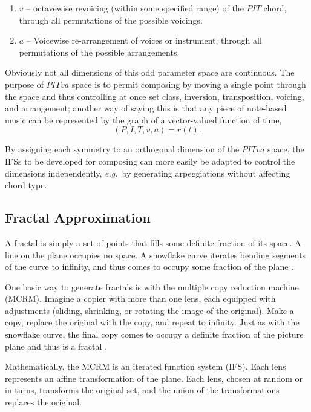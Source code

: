 \documentclass[english,11pt,letterpaper,onecolumn]{scrartcl}
\numberwithin{equation}{section}
\begin{document}
    \begin{enumerate}[resume]
        \item $v$ -- octavewise revoicing (within some specified range) of the 
        $PIT$ chord, through all permutations of the possible voicings.
        \item $a$ -- Voicewise re-arrangement of voices or instrument, through all
        permutations of the possible arrangements.
    \end{enumerate}
    
    \noindent Obviously not all dimensions of this odd parameter space are 
    continuous. The purpose of $PITva$ space is to permit composing by moving a 
    single point through the space and thus controlling at once set class, 
    inversion, transposition, voicing, and arrangement; another way of saying this 
    is that any piece of note-based music can be represented by the 
    graph of a vector-valued function of time, $$(P, I, T, v, a) = 
    r(t).$$
    
    By assigning each symmetry to an orthogonal dimension of the $PITva$ space, the 
    IFSs to be developed for composing can more easily be adapted to control the 
    dimensions independently, \textit{e.g.}\ by generating arpeggiations without 
    affecting chord type.
    
    \subsection{Fractal Approximation}
    
    A fractal is simply a set of points that fills some definite fraction of its 
    space. A line on the plane occupies no space. A snowflake curve iterates 
    bending segments of the curve to infinity, and thus comes to occupy some 
    fraction of the plane \cite{Mandelbrot:1982:FGN}.
    
    One basic way to generate fractals is with the multiple copy reduction 
    machine (MCRM). Imagine a copier with more than one lens, each equipped with 
    adjustments (sliding, shrinking, or rotating the image of the original). Make 
    a copy, replace the original with the copy, and repeat to infinity. Just as 
    with the snowflake curve, the final copy comes to occupy a definite fraction 
    of the picture plane and thus is a fractal \cite{chaosandfractals}. 
    
    Mathematically, the MCRM is an iterated function system (IFS). Each lens 
    represents an affine transformation of the plane. Each lens, chosen at random 
    or in turns, transforms the original set, and the union of the transformations  
    replaces the original.
    
\end{document}
